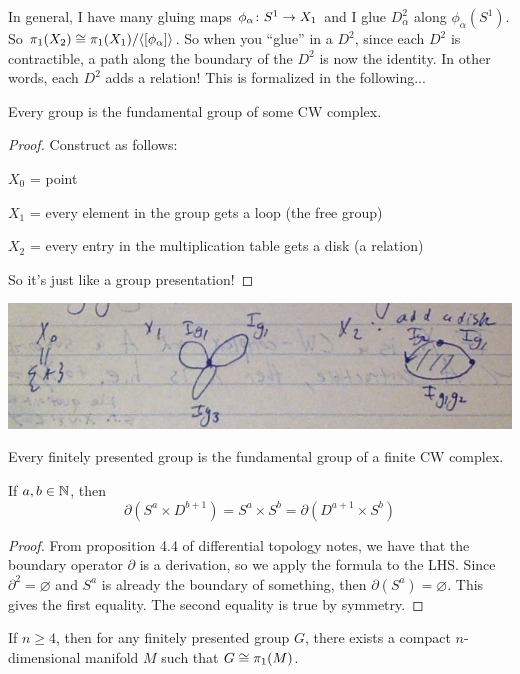 \documentclass[11pt,leqno,oneside]{amsart}
\numberwithin{thm}{section}
\renewcommand{\null}{\varnothing}
\renewcommand{\d}{\partial}
\newcommand{\fund}[1][1]{\pi_{#1}}
\newcommand{\x}{\times}
\begin{document}
In general, I have many gluing maps $\phi_\alpha\colon S^1 \to X_1$ and I glue $D^2_\alpha$ along $\phi_\alpha(S^1)$.  So $\fund(X_2) \isom \fund(X_1)/\langle[\phi_\alpha]\rangle$.  So when you ``glue'' in a $D^2$, since each $D^2$ is contractible, a path along the boundary of the $D^2$ is now the identity. In other words, each $D^2$ adds a relation!  This is formalized in the following...

\begin{thm}
  Every group is the fundamental group of some CW complex.
\end{thm}
\begin{proof}
  Construct as follows:

  $X_0$ = point

  $X_1$ = every element in the group gets a loop (the free group)

  $X_2$ = every entry in the multiplication table gets a disk (a relation)

  So it's just like a group presentation!
\end{proof}
\begin{example}
  \includegraphics[scale=0.4]{images/cw-complex-group-presentation}
\end{example}
\begin{cor}
  Every finitely presented group is the fundamental group of a finite CW complex.
\end{cor}
\begin{lem}
  If $a, b \in {\mathbb N}$, then $$\d( S^a \x D^{b+1} ) = S^a \x S^b = \d(D^{a+1} \x S^b)$$
\end{lem}
\begin{proof}
  From proposition 4.4 of differential topology notes, we have that the boundary operator $\d$ is a derivation, so we apply the formula to the LHS.  Since $\d^2 = \null$ and $S^a$ is already the boundary of something, then $\d(S^a) = \null$.  This gives the first equality.  The second equality is true by symmetry.
\end{proof}
\begin{thm}
  If $n \geq 4$, then for any finitely presented group $G$, there exists
  a compact $n$-dimensional manifold $M$ such that $G \isom \fund(M)$.
\end{thm}
\end{document}
